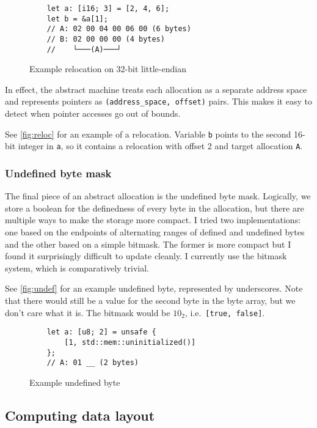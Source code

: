 \documentclass[twocolumn]{article}
\newcommand{\rust}[1]{\texttt{#1}}
\begin{document}
\begin{figure}[ht]
  \begin{verbatim}
    let a: [i16; 3] = [2, 4, 6];
    let b = &a[1];
    // A: 02 00 04 00 06 00 (6 bytes)
    // B: 02 00 00 00 (4 bytes)
    //    └───(A)───┘
  \end{verbatim}
  \caption{Example relocation on 32-bit little-endian}
  \label{fig:reloc}
\end{figure}

In effect, the abstract machine treats each allocation as a separate address space and represents
pointers as \rust{(address_space, offset)} pairs. This makes it easy to detect when pointer accesses
go out of bounds.

See \autoref{fig:reloc} for an example of a relocation. Variable \rust{b} points to the second
16-bit integer in \rust{a}, so it contains a relocation with offset 2 and target allocation
\rust{A}.

\subsubsection{Undefined byte mask}

The final piece of an abstract allocation is the undefined byte mask. Logically, we store a boolean
for the definedness of every byte in the allocation, but there are multiple ways to make the storage
more compact. I tried two implementations: one based on the endpoints of alternating ranges of
defined and undefined bytes and the other based on a simple bitmask. The former is more compact but
I found it surprisingly difficult to update cleanly. I currently use the bitmask system, which is
comparatively trivial.

See \autoref{fig:undef} for an example undefined byte, represented by underscores. Note that there
would still be a value for the second byte in the byte array, but we don't care what it is. The
bitmask would be $10_2$, i.e.\ \rust{[true, false]}.

\begin{figure}[hb]
  \begin{verbatim}
    let a: [u8; 2] = unsafe {
        [1, std::mem::uninitialized()]
    };
    // A: 01 __ (2 bytes)
  \end{verbatim}
  \caption{Example undefined byte}
  \label{fig:undef}
\end{figure}

\subsection{Computing data layout}
\end{document}
